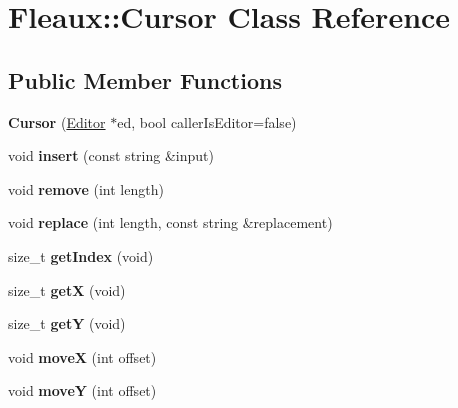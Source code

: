 \hypertarget{classFleaux_1_1Cursor}{}\section{Fleaux\+:\+:Cursor Class Reference}
\label{classFleaux_1_1Cursor}
\subsection*{Public Member Functions}
\begin{DoxyCompactItemize}
\item 
\hypertarget{classFleaux_1_1Cursor_a4dcda4244b32b97d7251a64719a348b7}{}{\bfseries Cursor} (\hyperlink{classFleaux_1_1Editor}{Editor} $\ast$ed, bool caller\+Is\+Editor=false)\label{classFleaux_1_1Cursor_a4dcda4244b32b97d7251a64719a348b7}

\item 
\hypertarget{classFleaux_1_1Cursor_a99c820ad3d952b5e38a41a11c18e7c2f}{}void {\bfseries insert} (const string \&input)\label{classFleaux_1_1Cursor_a99c820ad3d952b5e38a41a11c18e7c2f}

\item 
\hypertarget{classFleaux_1_1Cursor_a0fca52d6d4e589f8eef50a351e8340ff}{}void {\bfseries remove} (int length)\label{classFleaux_1_1Cursor_a0fca52d6d4e589f8eef50a351e8340ff}

\item 
\hypertarget{classFleaux_1_1Cursor_a439606f718dd885f4f96ca3244c3172a}{}void {\bfseries replace} (int length, const string \&replacement)\label{classFleaux_1_1Cursor_a439606f718dd885f4f96ca3244c3172a}

\item 
\hypertarget{classFleaux_1_1Cursor_ab74cdfed4d67434dab2b754de3ac875b}{}size\+\_\+t {\bfseries get\+Index} (void)\label{classFleaux_1_1Cursor_ab74cdfed4d67434dab2b754de3ac875b}

\item 
\hypertarget{classFleaux_1_1Cursor_a22527c0a0b5a1a2ca55b9cdbde15d2a1}{}size\+\_\+t {\bfseries get\+X} (void)\label{classFleaux_1_1Cursor_a22527c0a0b5a1a2ca55b9cdbde15d2a1}

\item 
\hypertarget{classFleaux_1_1Cursor_a676f4b83754926e416883564ffdfd4ca}{}size\+\_\+t {\bfseries get\+Y} (void)\label{classFleaux_1_1Cursor_a676f4b83754926e416883564ffdfd4ca}

\item 
\hypertarget{classFleaux_1_1Cursor_adf0fdc3d40006ee0c34a5b04e892725d}{}void {\bfseries move\+X} (int offset)\label{classFleaux_1_1Cursor_adf0fdc3d40006ee0c34a5b04e892725d}

\item 
\hypertarget{classFleaux_1_1Cursor_aee726a762eb58a76586a8e8cf528dc73}{}void {\bfseries move\+Y} (int offset)\label{classFleaux_1_1Cursor_aee726a762eb58a76586a8e8cf528dc73}

\end{DoxyCompactItemize}
